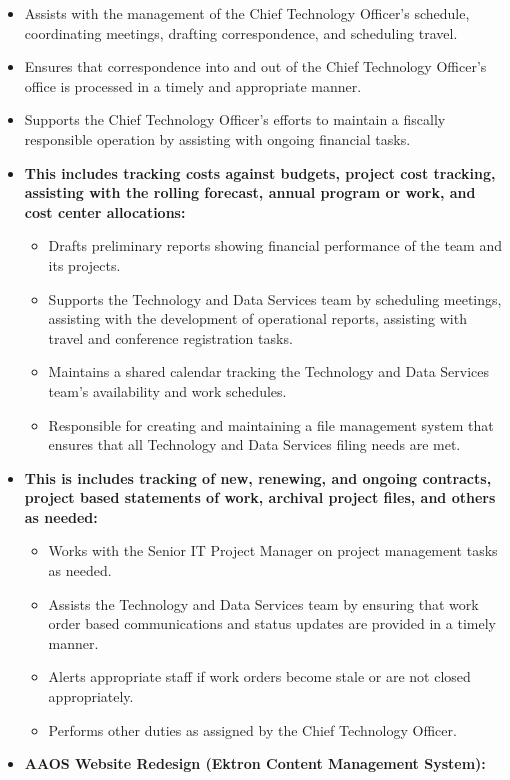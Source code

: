 \documentclass[a4papper,overlapped,line]{res}
\begin{document}
\begin{resume}
\begin{itemize}
	\item Assists with the management of the Chief Technology Officer’s schedule, coordinating meetings, drafting correspondence, and scheduling travel.
	\item Ensures that correspondence into and out of the Chief Technology Officer’s office is processed in a timely and appropriate manner.
	\item Supports the Chief Technology Officer’s efforts to maintain a fiscally responsible operation by assisting with ongoing financial tasks.
	\item \textbf{This includes tracking costs against budgets, project cost tracking, assisting with the rolling forecast, annual program or work, and cost center allocations:}
\begin{itemize}
	\item Drafts preliminary reports showing financial performance of the team and its projects. 
	\item Supports the Technology and Data Services team by scheduling meetings, assisting with the development of operational reports, assisting with travel and conference registration tasks.
	\item Maintains a shared calendar tracking the Technology and Data Services team’s availability and work schedules. 
	\item Responsible for creating and maintaining a file management system that ensures that all Technology and Data Services filing needs are met.
\end{itemize} 
	\item \textbf{This  is includes tracking of new, renewing, and ongoing contracts, project based statements of work, archival project files, and others as needed:}
\begin{itemize}
	\item Works with the Senior IT Project Manager on project management tasks as needed. 
	\item Assists the Technology and Data Services team by ensuring that work order based communications and status updates are provided in a timely manner. 
	\item Alerts appropriate staff if work orders become stale or are not closed appropriately.
	\item Performs other duties as assigned by the Chief Technology Officer.
\end{itemize}
	\item \textbf{AAOS Website Redesign (Ektron Content Management System):}
\begin{itemize}

\end{itemize}
\end{itemize}
\end{resume}
\end{document}
